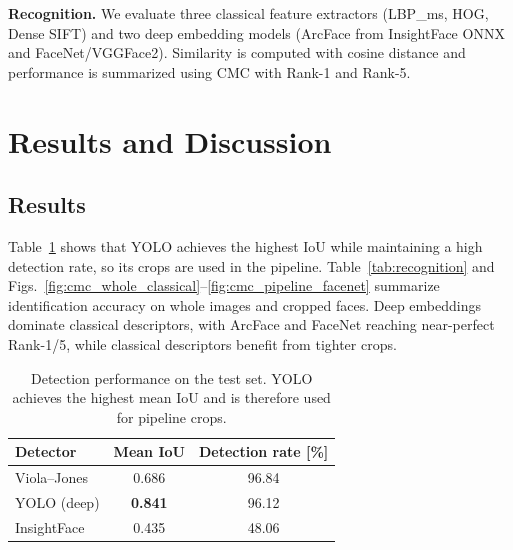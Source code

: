 ﻿\documentclass[conference]{IEEEtran}
\begin{document}
\textbf{Recognition.} We evaluate three classical feature extractors (LBP\_ms, HOG, Dense SIFT) and two deep embedding models (ArcFace from InsightFace ONNX and FaceNet/VGGFace2).
Similarity is computed with cosine distance and performance is summarized using CMC with Rank-1 and Rank-5.

\section{Results and Discussion}

\subsection{Results}
\vspace{-0.2em}
Table~\ref{tab:detection} shows that YOLO achieves the highest IoU while maintaining a high detection rate, so its crops are used in the pipeline.
Table~\ref{tab:recognition} and Figs.~\ref{fig:cmc_whole_classical}--\ref{fig:cmc_pipeline_facenet} summarize identification accuracy on whole images and cropped faces.
Deep embeddings dominate classical descriptors, with ArcFace and FaceNet reaching near-perfect Rank-1/5, while classical descriptors benefit from tighter crops.

\begin{table}[t]
\caption{Detection performance on the test set. YOLO achieves the highest mean IoU and is therefore used for pipeline crops.}
\centering
\scriptsize
\begin{tabular}{lcc}
\textbf{Detector} & \textbf{Mean IoU} & \textbf{Detection rate [\%]} \\
\hline
Viola--Jones & 0.686 & 96.84 \\
YOLO (deep)  & \textbf{0.841} & 96.12 \\
InsightFace  & 0.435 & 48.06 \\
\end{tabular}
\label{tab:detection}
\vspace{-1.0em}
\end{table}
\end{document}
